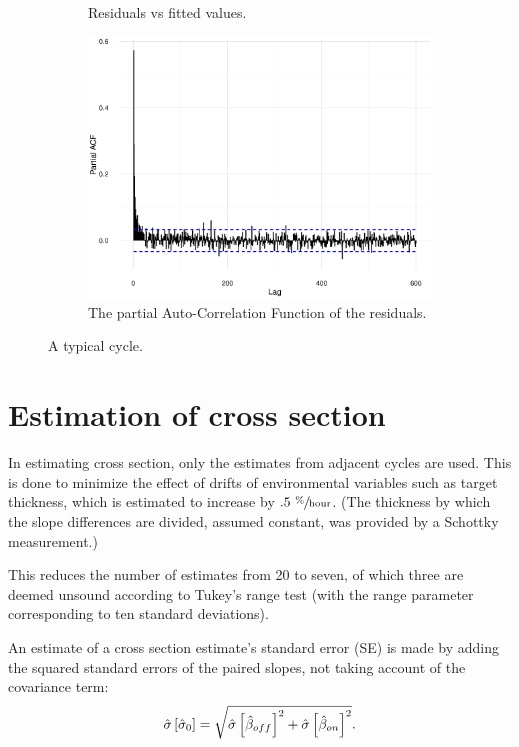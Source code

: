 \documentclass[reprint]{revtex4-1}
\newcommand{\scl}{.39}
\begin{document}
\begin{figure}
\begin{subfigure}{.5\textwidth}
\caption{Residuals vs fitted values.}
\end{subfigure}
\begin{subfigure}{.5\textwidth}
\includegraphics[scale=\scl]{img/Run969_residual_PACF.eps}
\caption{The partial Auto-Correlation Function of the residuals.}
\end{subfigure}
\caption{A typical cycle.\label{fig:Run969}}
\end{figure}

\section{Estimation of cross section}

In estimating cross section, only the estimates from adjacent cycles are used. This is done to minimize the effect of drifts of environmental variables such as target thickness, which is estimated to increase by $.5~ \sfrac{\%}{\mathrm{hour}}$. (The thickness by which the slope differences are divided, assumed constant, was provided by a Schottky measurement.)

This reduces the number of estimates from 20 to seven, of which three are deemed unsound according to Tukey's range test (with the range parameter corresponding to ten standard deviations). 

An estimate of a cross section estimate's standard error (SE) is made by adding the squared standard errors of the paired slopes, not taking account of the covariance term:
\begin{equation}
	\SE*{\CS*[0]} = \sqrt{\SE*{\slp*[off]}^2 + \SE*{\slp*[on]}^2}.
\end{equation}
\end{document}
